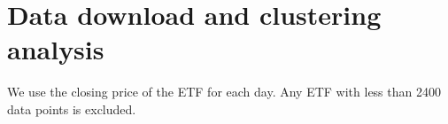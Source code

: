 \section{Data download and clustering analysis}

We use the closing price of the ETF for each day.
Any ETF with less than 2400 data points is excluded.
